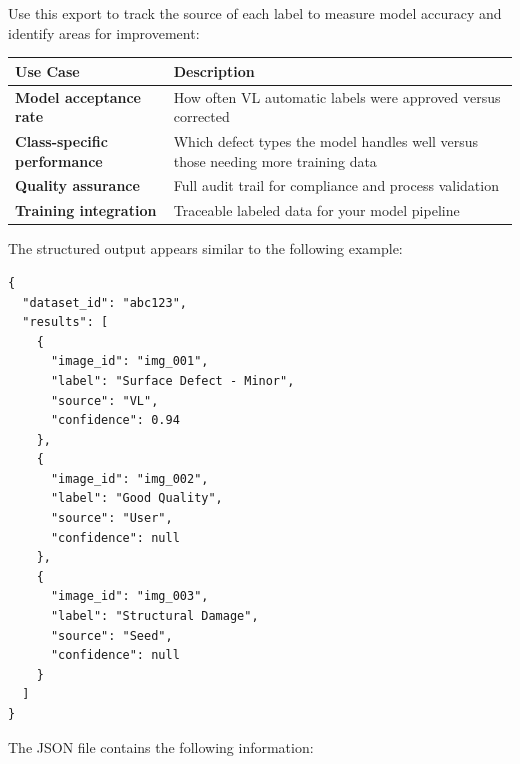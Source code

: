 \documentclass[
  11pt,
  a4paper,
  11pt,
  oneside]{report}
\renewcommand{\toprule}{\hline}
\renewcommand{\midrule}{\hline}
\renewcommand{\bottomrule}{\hline}
\begin{document}
Use this export to track the source of each label to measure model
accuracy and identify areas for improvement:

\begin{longtable}[]{@{}
  >{\raggedright\arraybackslash}p{}
  >{\raggedright\arraybackslash}p{}@{}}
\toprule\noalign{}
\begin{minipage}[b]{\linewidth}\raggedright
\textbf{Use Case}
\end{minipage} & \begin{minipage}[b]{\linewidth}\raggedright
\textbf{Description}
\end{minipage} \\
\midrule\noalign{}
\endhead
\bottomrule\noalign{}
\endlastfoot
\textbf{Model acceptance rate} & How often VL automatic labels were
approved versus corrected \\
\textbf{Class-specific performance} & Which defect types the model
handles well versus those needing more training data \\
\textbf{Quality assurance} & Full audit trail for compliance and process
validation \\
\textbf{Training integration} & Traceable labeled data for your model
pipeline \\
\end{longtable}

The structured output appears similar to the following example:

\begin{lstlisting}
{
  "dataset_id": "abc123",
  "results": [
    {
      "image_id": "img_001",
      "label": "Surface Defect - Minor",
      "source": "VL",
      "confidence": 0.94
    },
    {
      "image_id": "img_002",
      "label": "Good Quality",
      "source": "User",
      "confidence": null
    },
    {
      "image_id": "img_003",
      "label": "Structural Damage",
      "source": "Seed",
      "confidence": null
    }
  ]
}
\end{lstlisting}

The JSON file contains the following information:
\end{document}
